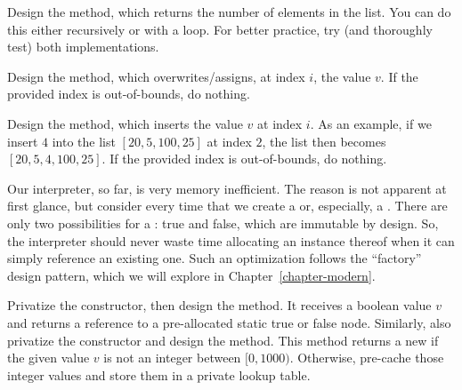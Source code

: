 
Design the  method, which returns the number of elements in the list. You can do this either recursively or with a loop. For better practice, try (and thoroughly test) both implementations.

Design the  method, which overwrites/assigns, at index $i$, the value $v$. If the provided index is out-of-bounds, do nothing.

Design the  method, which inserts the value $v$ at index $i$. As an example, if we insert $4$ into the list $[20, 5, 100, 25]$ at index $2$, the list then becomes $[20, 5, 4, 100, 25]$. If the provided index is out-of-bounds, do nothing.

Our interpreter, so far, is very memory inefficient. The reason is not apparent at first glance, but consider every time that we create a  or, especially, a . There are only two possibilities for a : true and false, which are immutable by design. So, the interpreter should never waste time allocating an instance thereof when it can simply reference an existing one. Such an optimization follows the ``factory'' design pattern, which we will explore in Chapter~\ref{chapter-modern}.

Privatize the  constructor, then design the  method. It receives a boolean value $v$ and returns a reference to a pre-allocated static true or false node. Similarly, also privatize the  constructor and design the  method. This method returns a new  if the given value $v$ is not an integer between $[0, 1000)$. Otherwise, pre-cache those integer values and store them in a private lookup table.

